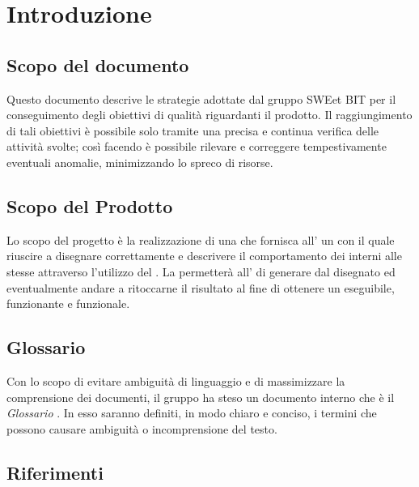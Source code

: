 \section{Introduzione}
  \subsection{Scopo del documento}
          Questo documento descrive le strategie adottate dal gruppo SWEet BIT per il conseguimento degli obiettivi di qualità riguardanti il prodotto.
          Il raggiungimento di tali obiettivi è possibile solo tramite una precisa e continua verifica delle attività svolte; così facendo è possibile
          rilevare e correggere tempestivamente eventuali anomalie, minimizzando lo spreco di risorse.
  \subsection{Scopo del Prodotto}
          Lo scopo del progetto è la realizzazione di una  che fornisca all' un   con il quale riuscire a disegnare correttamente 
          e descrivere il comportamento dei  interni alle stesse attraverso l'utilizzo del .
          La  permetterà all' di generare   dal  disegnato ed eventualmente andare a ritoccarne il risultato al fine di ottenere un 
          eseguibile, funzionante e funzionale.
  \subsection{Glossario}
          Con lo scopo di evitare ambiguità di linguaggio e di massimizzare la comprensione dei documenti, il
          gruppo ha steso un documento interno che è il \emph{Glossario \VersioneG{}}. In esso saranno definiti, in modo
          chiaro e conciso, i termini che possono causare ambiguità o incomprensione del testo.
  \subsection{Riferimenti}
